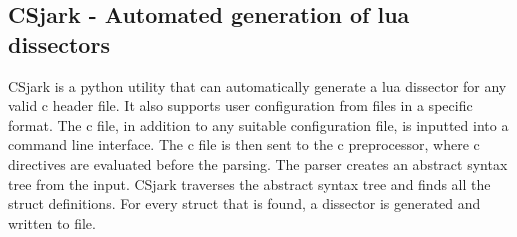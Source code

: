 

\subsection*{CSjark - Automated generation of \Gls{lua} \glspl{dissector}}
CSjark is a \Gls{python} \gls{utility} that can automatically generate a \Gls{lua} \gls{dissector} for 
any valid \Gls{c} \gls{header} file. It also supports user configuration from files in a specific format.
The \Gls{c} file, in addition to any suitable configuration file, is inputted into a command line interface.
The \Gls{c} file is then sent to the \Gls{c} preprocessor, where \Gls{c} directives are evaluated before the parsing.
The \gls{parser} creates an abstract syntax tree from the input.
CSjark traverses the abstract syntax tree and finds all the \gls{struct} definitions.
For every \gls{struct} that is found, a \gls{dissector} is generated and written to file.






